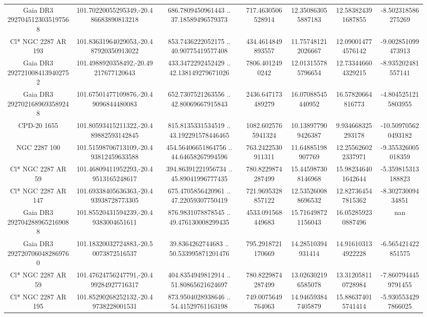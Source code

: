 \begin{table}
\begin{tabular}{ccccccc}
Gaia DR3 2927045123035197568 & 101.70220055295349,-20.486683890813218 & 686.7809450961443 .. 37.18589496579373 & 717.4630506528914 & 12.350863055887183 & 12.583824391687855 & -8.502318586275269 \\
Cl* NGC 2287     AR     193 & 101.83631964029053,-20.487920350913022 & 853.7436222052175 .. 40.90775419577408 & 434.4614849893557 & 11.757481212026667 & 12.090014774576142 & -9.002851099473913 \\
Gaia DR3 2927210084139402752 & 101.4988920358492,-20.49217677120643 & 433.3472292452429 .. 42.138149279671026 & 7806.4012490242 & 12.013155785796654 & 12.733446604329215 & -8.935202481557141 \\
Gaia DR3 2927021689693589248 & 101.67501477109876,-20.49096844480083 & 652.7307521263556 .. 42.80069667915843 & 2436.647173489279 & 16.07088545440952 & 16.57820664816773 & -4.8045251215803955 \\
CPD-20  1655 & 101.80593415211322,-20.489882593142845 & 815.8135331534519 .. 43.192291578446465 & 1082.6025765941324 & 10.138977909426387 & 9.934668325293178 & -10.509705620493182 \\
NGC  2287   100 & 101.51598706713109,-20.493812459633588 & 454.56406651864756 .. 44.64658267994596 & 763.2422530911311 & 11.64885198907769 & 12.255626022337971 & -9.355326005018359 \\
Cl* NGC 2287     AR      59 & 101.46809411952293,-20.49513165248617 & 394.86391221956734 .. 45.89041996777435 & 780.8229874287499 & 15.445987308146968 & 15.982346401642644 & -5.359815313188823 \\
Cl* NGC 2287     AR     147 & 101.69338405636363,-20.493938728773305 & 675.4705856420961 .. 47.22059307750419 & 721.9695328857122 & 12.535260088696532 & 12.827364547815362 & -8.30273009434851 \\
Gaia DR3 2927042889652169088 & 101.85520431594239,-20.49383004651611 & 876.9831078878545 .. 49.476130008299435 & 4533.091568449683 & 15.716498721156043 & 16.052859230887496 & nan \\
Gaia DR3 2927207060482869760 & 101.18320032724883,-20.50073872516537 & 39.8364262744683 .. 50.533995871201476 & 795.2918721170669 & 14.28510394931414 & 14.916103134922228 & -6.565421422851575 \\
Cl* NGC 2287     AR      59 & 101.47624756247791,-20.499284927716317 & 404.8354949812914 .. 51.80865621624697 & 780.8229874287499 & 13.026302196585078 & 13.312058110728984 & -7.8607944459791455 \\
Cl* NGC 2287     AR     195 & 101.85290268252132,-20.49738228001531 & 873.9504028938646 .. 54.41529761163198 & 749.0075649764063 & 14.946593847405879 & 15.886374015741414 & -5.9305534297866025 \\

\end{tabular}
\end{table}
